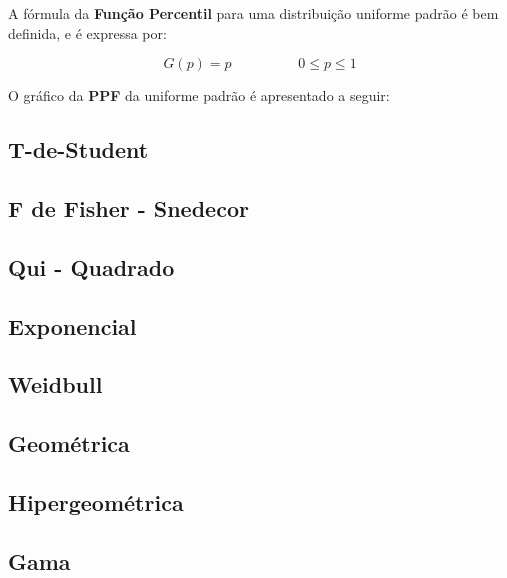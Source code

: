\documentclass[
]{book}
\begin{document}
A fórmula da \textbf{Função Percentil} para uma distribuição uniforme padrão é bem definida, e é expressa por:

\begin{equation}
  G(p) = p \hspace{2cm} 0 \leq p \leq 1
\end{equation}

O gráfico da \textbf{PPF} da uniforme padrão é apresentado a seguir:

\hypertarget{t-de-student}{%
\subsection{T-de-Student}\label{t-de-student}}

\hypertarget{f-de-fisher---snedecor}{%
\subsection{F de Fisher - Snedecor}\label{f-de-fisher---snedecor}}

\hypertarget{qui---quadrado}{%
\subsection{Qui - Quadrado}\label{qui---quadrado}}

\hypertarget{exponencial}{%
\subsection{Exponencial}\label{exponencial}}

\hypertarget{weidbull}{%
\subsection{Weidbull}\label{weidbull}}

\hypertarget{geomuxe9trica}{%
\subsection{Geométrica}\label{geomuxe9trica}}

\hypertarget{hipergeomuxe9trica}{%
\subsection{Hipergeométrica}\label{hipergeomuxe9trica}}

\hypertarget{gama}{%
\subsection{Gama}\label{gama}}
\end{document}
